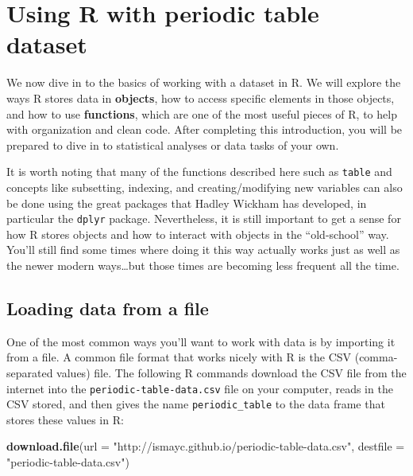 \documentclass[]{tufte-book}
\newenvironment{Shaded}{\begin{snugshade}}{\end{snugshade}}
\newcommand{\DataTypeTok}[1]{\textcolor[rgb]{0.13,0.29,0.53}{#1}}
\newcommand{\KeywordTok}[1]{\textcolor[rgb]{0.13,0.29,0.53}{\textbf{#1}}}
\newcommand{\NormalTok}[1]{#1}
\newcommand{\StringTok}[1]{\textcolor[rgb]{0.31,0.60,0.02}{#1}}
\begin{document}
\hypertarget{using-r-with-periodic-table-dataset}{%
\section{Using R with periodic table dataset}\label{using-r-with-periodic-table-dataset}}

We now dive in to the basics of working with a dataset in R. We will explore the ways R stores data in \textbf{objects}, how to access specific elements in those objects, and how to use \textbf{functions}, which are one of the most useful pieces of R, to help with organization and clean code. After completing this introduction, you will be prepared to dive in to statistical analyses or data tasks of your own.

It is worth noting that many of the functions described here such as \texttt{table} and concepts like subsetting, indexing, and creating/modifying new variables can also be done using the great packages that Hadley Wickham has developed, in particular the \texttt{dplyr} package. Nevertheless, it is still important to get a sense for how R stores objects and how to interact with objects in the ``old-school'' way. You'll still find some times where doing it this way actually works just as well as the newer modern ways\ldots but those times are becoming less frequent all the time.

\hypertarget{loading-data-from-a-file}{%
\subsection{Loading data from a file}\label{loading-data-from-a-file}}

One of the most common ways you'll want to work with data is by importing it from a file. A common file format that works nicely with R is the CSV (comma-separated values) file. The following R commands download the CSV file from the internet into the \texttt{periodic-table-data.csv} file on your computer, reads in the CSV stored, and then gives the name \texttt{periodic\_table} to the data frame that stores these values in R:

\begin{Shaded}
\begin{Highlighting}[]
\KeywordTok{download.file}\NormalTok{(}\DataTypeTok{url =} \StringTok{"http://ismayc.github.io/periodic{-}table{-}data.csv"}\NormalTok{,}
 \DataTypeTok{destfile =} \StringTok{"periodic{-}table{-}data.csv"}\NormalTok{)}
\end{Highlighting}
\end{Shaded}
\end{document}
